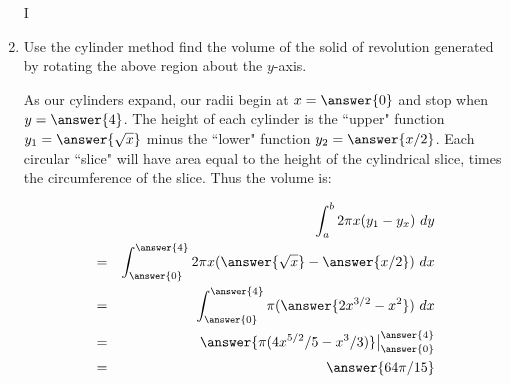 \documentclass{ximera}
\begin{document}
\begin{question}
\begin{enumerate}
I

\item Use the cylinder method find the volume of the solid of revolution generated by rotating the above region about the $y$-axis.

\begin{explanation}
As our cylinders expand, our radii begin at $x=\answer{0}$ and stop when $y=\answer{4}$.  The height of each cylinder is the ``upper" function $y_1=\answer{\sqrt{x}}$ minus the ``lower" function $y_2=\answer{x/2}$.  Each circular ``slice" will have area equal to the height of the cylindrical slice, times the circumference of the slice.  Thus the volume is:

\begin{eqnarray*}
&&\int_a^b 2\pi x(y_1-y_x)\ dy\\
&=&\int_{\answer{0}}^{\answer{4}}2\pi x(\answer{\sqrt{x}}-\answer{x/2})\ dx\\
&=&\int_{\answer{0}}^{\answer{4}}\pi (\answer{2x^{3/2}-x^2})\ dx\\
&=&\answer{\pi(4x^{5/2}/5-x^3/3)}\big|_{\answer{0}}^{\answer{4}}\\
&=&\answer{64\pi/15}
\end{eqnarray*}


\end{explanation}




\end{enumerate}

\end{question}
\end{document}
